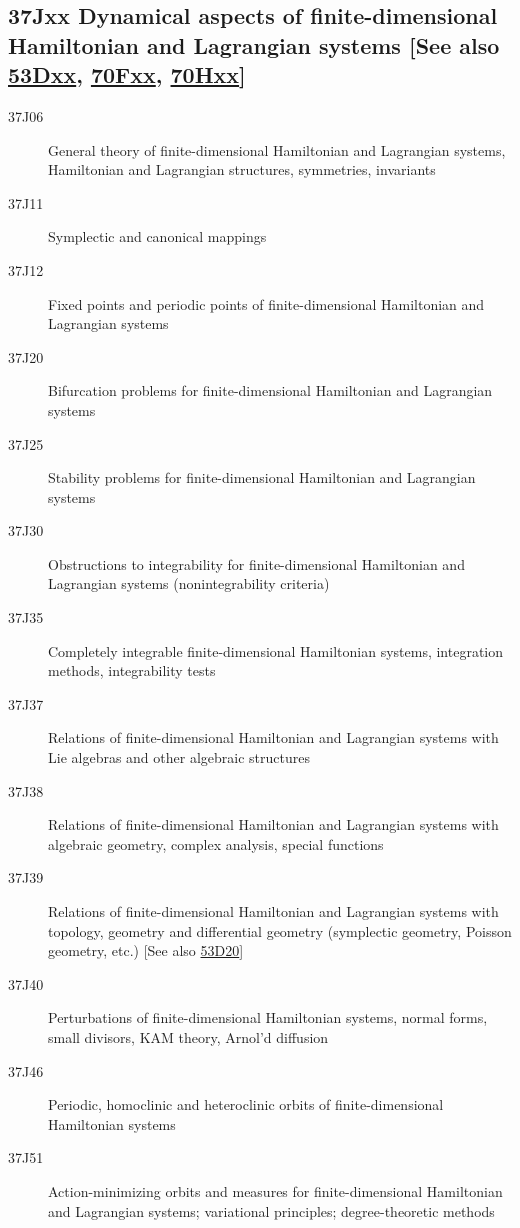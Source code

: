 \subsection*{37Jxx  Dynamical  aspects of finite-dimensional Hamiltonian and  Lagrangian systems [See also \hyperref[53Dxx]{53Dxx}, \hyperref[70Fxx]{70Fxx}, \hyperref[70Hxx]{70Hxx}] }\label{37Jxx}
\begin{description} 
\item [37J06]\label{37J06} General theory of finite-dimensional Hamiltonian and Lagrangian systems, Hamiltonian and Lagrangian structures, symmetries, invariants 
\item [37J11]\label{37J11} Symplectic and canonical mappings
\item [37J12]\label{37J12} Fixed points and periodic points of finite-dimensional Hamiltonian and Lagrangian systems
\item [37J20]\label{37J20} Bifurcation problems for finite-dimensional Hamiltonian and Lagrangian systems
\item [37J25]\label{37J25} Stability problems for finite-dimensional Hamiltonian and Lagrangian systems
\item [37J30]\label{37J30} Obstructions to integrability for finite-dimensional Hamiltonian and Lagrangian systems (nonintegrability criteria)
\item [37J35]\label{37J35} Completely integrable finite-dimensional Hamiltonian systems,  integration methods, integrability tests 
\item [37J37]\label{37J37} Relations of finite-dimensional Hamiltonian and Lagrangian systems with Lie algebras and other algebraic structures 
\item [37J38]\label{37J38} Relations of finite-dimensional Hamiltonian and Lagrangian systems with algebraic geometry, complex analysis, special functions
\item [37J39]\label{37J39} Relations of finite-dimensional Hamiltonian and Lagrangian systems with topology, geometry and differential geometry (symplectic geometry, Poisson geometry, etc.) [See also \hyperref[53D20]{53D20}]
\item [37J40]\label{37J40} Perturbations of finite-dimensional Hamiltonian systems, normal forms, small divisors, KAM theory, Arnol'd diffusion
\item [37J46]\label{37J46} Periodic, homoclinic and heteroclinic orbits of finite-dimensional Hamiltonian systems 
\item [37J51]\label{37J51} Action-minimizing orbits and measures for finite-dimensional Hamiltonian and Lagrangian systems; variational principles; degree-theoretic methods

\end{description}
